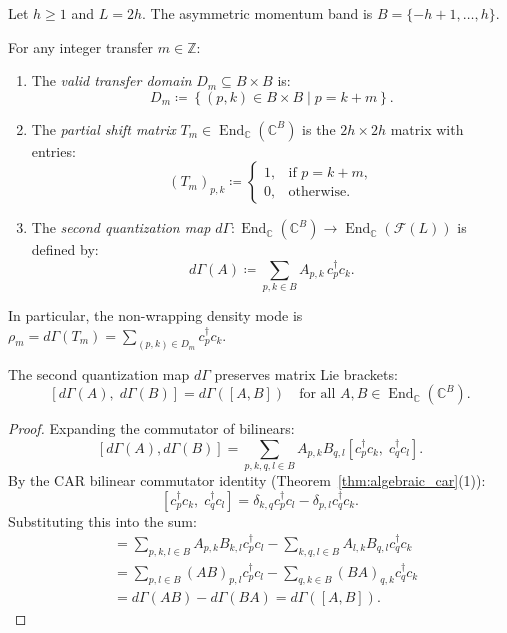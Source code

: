 Let $h \ge 1$ and $L = 2h$. The asymmetric momentum band is $B = \{-h+1, \dots, h\}$.

\begin{definition}
For any integer transfer $m \in \mathbb{Z}$:
\begin{enumerate}
    \item The \emph{valid transfer domain} $D_m \subseteq B \times B$ is:
    \begin{equation}
    D_m \coloneqq \left\{ (p, k) \in B \times B \mid p = k + m \right\}.
    \end{equation}
    \item The \emph{partial shift matrix} $T_m \in \operatorname{End}_{\mathbb{C}}(\mathbb{C}^B)$ is the $2h \times 2h$ matrix with entries:
    \begin{equation}
    (T_m)_{p, k} \coloneqq \begin{cases} 1, & \text{if } p = k + m, \\ 0, & \text{otherwise}. \end{cases}
    \end{equation}
    \item The \emph{second quantization map} $d\Gamma : \operatorname{End}_{\mathbb{C}}(\mathbb{C}^B) \to \operatorname{End}_{\mathbb{C}}(\mathcal{F}(L))$ is defined by:
    \begin{equation}
    d\Gamma(A) \coloneqq \sum_{p, k \in B} A_{p, k}\, c_p^\dagger c_k.
    \end{equation}
\end{enumerate}
In particular, the non-wrapping density mode is $\rho_m = d\Gamma(T_m) = \sum_{(p, k) \in D_m} c_p^\dagger c_k$.
\end{definition}

\begin{lemma}
\label{lem:app_dgamma_lie}
The second quantization map $d\Gamma$ preserves matrix Lie brackets:
\begin{equation}
\left[ d\Gamma(A), \; d\Gamma(B) \right] = d\Gamma([A, B]) \quad \text{for all } A, B \in \operatorname{End}_{\mathbb{C}}(\mathbb{C}^B).
\end{equation}
\end{lemma}

\begin{proof}
Expanding the commutator of bilinears:
\[
[d\Gamma(A), d\Gamma(B)] = \sum_{p, k, q, l \in B} A_{p, k} B_{q, l} \left[ c_p^\dagger c_k, \; c_q^\dagger c_l \right].
\]
By the CAR bilinear commutator identity (Theorem~\ref{thm:algebraic_car}(1)):
\[
[c_p^\dagger c_k, \; c_q^\dagger c_l] = \delta_{k, q} c_p^\dagger c_l - \delta_{p, l} c_q^\dagger c_k.
\]
Substituting this into the sum:
\begin{align*}
[d\Gamma(A), d\Gamma(B)] &= \sum_{p, k, l \in B} A_{p, k} B_{k, l} c_p^\dagger c_l - \sum_{k, q, l \in B} A_{l, k} B_{q, l} c_q^\dagger c_k \\
&= \sum_{p, l \in B} (A B)_{p, l} c_p^\dagger c_l - \sum_{q, k \in B} (B A)_{q, k} c_q^\dagger c_k \\
&= d\Gamma(A B) - d\Gamma(B A) = d\Gamma([A, B]).
\end{align*}
\end{proof}

